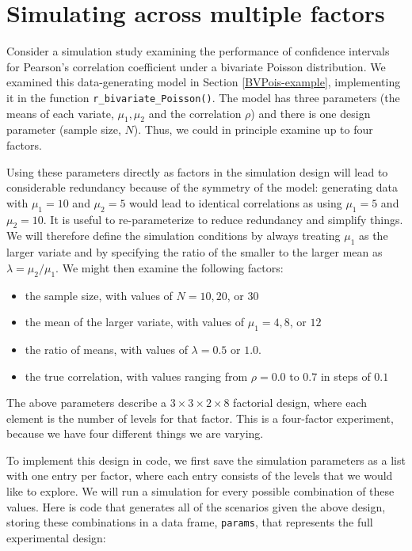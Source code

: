 \documentclass[
]{book}
\providecommand{\tightlist}{%
  \setlength{\itemsep}{0pt}\setlength{\parskip}{0pt}}
\begin{document}
\section{Simulating across multiple factors}\label{simulating-across-multiple-factors}

Consider a simulation study examining the performance of confidence intervals for Pearson's correlation coefficient under a bivariate Poisson distribution.
We examined this data-generating model in Section \ref{BVPois-example}, implementing it in the function \texttt{r\_bivariate\_Poisson()}. The model has three parameters (the means of each variate, \(\mu_1, \mu_2\) and the correlation \(\rho\)) and there is one design parameter (sample size, \(N\)).
Thus, we could in principle examine up to four factors.

Using these parameters directly as factors in the simulation design will lead to considerable redundancy because of the symmetry of the model: generating data with \(\mu_1 = 10\) and \(\mu_2 = 5\) would lead to identical correlations as using \(\mu_1 = 5\) and \(\mu_2 = 10\).
It is useful to re-parameterize to reduce redundancy and simplify things.
We will therefore define the simulation conditions by always treating \(\mu_1\) as the larger variate and by specifying the ratio of the smaller to the larger mean as \(\lambda = \mu_2 / \mu_1\).
We might then examine the following factors:

\begin{itemize}
\tightlist
\item
  the sample size, with values of \(N = 10, 20\), or \(30\)
\item
  the mean of the larger variate, with values of \(\mu_1 = 4, 8\), or \(12\)
\item
  the ratio of means, with values of \(\lambda = 0.5\) or \(1.0\).
\item
  the true correlation, with values ranging from \(\rho = 0.0\) to \(0.7\) in steps of \(0.1\)
\end{itemize}

The above parameters describe a \(3 \times 3 \times 2 \times 8\) factorial design, where each element is the number of levels for that factor. This is a four-factor experiment, because we have four different things we are varying.

To implement this design in code, we first save the simulation parameters as a list with one entry per factor, where each entry consists of the levels that we would like to explore.
We will run a simulation for every possible combination of these values.
Here is code that generates all of the scenarios given the above design, storing these combinations in a data frame, \texttt{params}, that represents the full experimental design:
\end{document}
